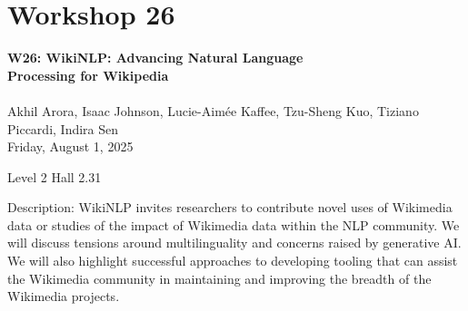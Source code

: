 \clearpage


\section[W26: WikiNLP: Advancing Natural Language Processing for Wikipedia]{Workshop 26}
\label{workshop_26}

\begin{center}
    {\Large \textbf{W26: WikiNLP: Advancing Natural Language \\
    Processing for Wikipedia}}\\
    
\\

Akhil Arora, Isaac Johnson, Lucie-Aimée Kaffee, Tzu-Sheng Kuo, Tiziano Piccardi, Indira Sen\\

    Friday, August 1, 2025

Level 2 Hall 2.31
    
\end{center}

Description: WikiNLP invites researchers to contribute novel uses of Wikimedia data or studies of the impact of Wikimedia data within the NLP community. We will discuss tensions around multilinguality and concerns raised by generative AI. We will also highlight successful approaches to developing tooling that can assist the Wikimedia community in maintaining and improving the breadth of the Wikimedia projects.


